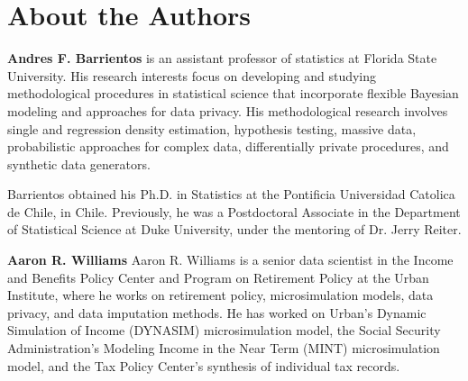 \fancyfoot{}



\part{About the Authors}

\textbf{Andres F. Barrientos} is an assistant professor of statistics at Florida State University. His research interests focus on developing and studying methodological procedures in statistical science that incorporate flexible Bayesian modeling and approaches for data privacy. His methodological research involves single and regression density estimation, hypothesis testing, massive data, probabilistic approaches for complex data, differentially private procedures, and synthetic data generators.

Barrientos obtained his Ph.D. in Statistics at the Pontificia Universidad Catolica de Chile, in Chile. Previously, he was a Postdoctoral Associate in the Department of Statistical Science at Duke University, under the mentoring of Dr. Jerry Reiter. 

\noindent\textbf{Aaron R. Williams} Aaron R. Williams is a senior data scientist in the Income and Benefits Policy Center and Program on Retirement Policy at the Urban Institute, where he works on retirement policy, microsimulation models, data privacy, and data imputation methods. He has worked on Urban’s Dynamic Simulation of Income (DYNASIM) microsimulation model, the Social Security Administration’s Modeling Income in the Near Term (MINT) microsimulation model, and the Tax Policy Center’s synthesis of individual tax records.

